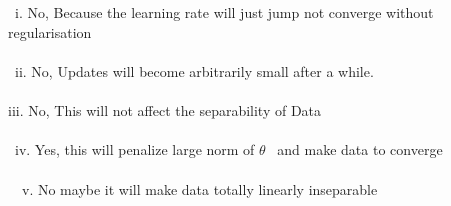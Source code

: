 \begin{answer}
\\ \\
\ i. No, Because the learning rate will just jump not converge without regularisation \\ \\
\ ii. No, Updates will become arbitrarily small after a while. \\ \\
iii. No, This will not affect the separability of Data \\ \\
\ iv. Yes, this will penalize large  norm of $\theta$ \ and make data to converge \\ \\
\ \ v. No maybe it will make data totally linearly inseparable \\ \\
\end{answer}

